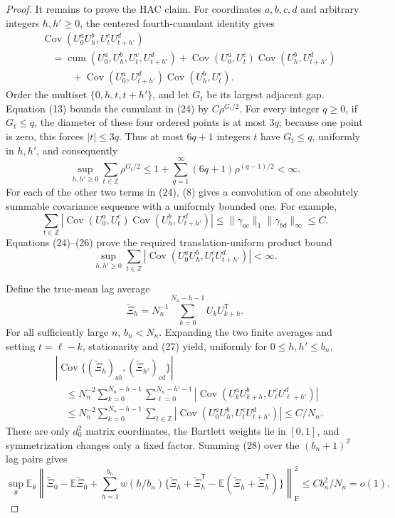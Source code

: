 \documentclass{article}
\begin{document}
\begin{proof}
It remains to prove the HAC claim.  For coordinates \(a,b,c,d\) and arbitrary integers \(h,h'\geq0\), the centered fourth-cumulant identity gives
\[
 \begin{aligned}
 &\operatorname{Cov}(U_0^aU_h^b,U_t^cU_{t+h'}^d)\\
 &\quad=\operatorname{cum}(U_0^a,U_h^b,U_t^c,U_{t+h'}^d)
 +\operatorname{Cov}(U_0^a,U_t^c)\operatorname{Cov}(U_h^b,U_{t+h'}^d)\\
 &\qquad\quad
 +\operatorname{Cov}(U_0^a,U_{t+h'}^d)\operatorname{Cov}(U_h^b,U_t^c).
 \end{aligned}
\tag{24}
\]
Order the multiset \(\{0,h,t,t+h'\}\), and let \(G_t\) be its largest adjacent gap.  Equation (13) bounds the cumulant in (24) by \(C\rho^{G_t/2}\).  For every integer \(q\geq0\), if \(G_t\leq q\), the diameter of these four ordered points is at most \(3q\); because one point is zero, this forces \(|t|\leq3q\).  Thus at most \(6q+1\) integers \(t\) have \(G_t\leq q\), uniformly in \(h,h'\), and consequently
\[
 \sup_{h,h'\geq0}\sum_{t\in\mathbb Z}\rho^{G_t/2}
 \leq 1+\sum_{q=1}^\infty(6q+1)\rho^{(q-1)/2}<\infty.
\tag{25}
\]
For each of the other two terms in (24), (8) gives a convolution of one absolutely summable covariance sequence with a uniformly bounded one.  For example,
\[
 \sum_{t\in\mathbb Z}
 |\operatorname{Cov}(U_0^a,U_t^c)
   \operatorname{Cov}(U_h^b,U_{t+h'}^d)|
 \leq
 \lVert\gamma_{ac}\rVert_1\lVert\gamma_{bd}\rVert_\infty\leq C.
\tag{26}
\]
Equations (24)--(26) prove the required translation-uniform product bound
\[
 \sup_{h,h'\geq0}\sum_{t\in\mathbb Z}
 |\operatorname{Cov}(U_0^aU_h^b,U_t^cU_{t+h'}^d)|<\infty.
\tag{27}
\]

Define the true-mean lag average
\[
 \widetilde\Xi_h=N_n^{-1}\sum_{k=0}^{N_n-h-1}U_kU_{k+h}^{\mathsf T}.
\]
For all sufficiently large \(n\), \(b_n<N_n\).  Expanding the two finite averages and setting \(t=\ell-k\), stationarity and (27) yield, uniformly for \(0\leq h,h'\leq b_n\),
\[
 \begin{aligned}
 &\left|\operatorname{Cov}\{(\widetilde\Xi_h)_{ab},
                         (\widetilde\Xi_{h'})_{cd}\}\right|\\
 &\quad\leq N_n^{-2}\sum_{k=0}^{N_n-h-1}
       \sum_{\ell=0}^{N_n-h'-1}
       |\operatorname{Cov}(U_k^aU_{k+h}^b,U_\ell^cU_{\ell+h'}^d)|\\
 &\quad\leq N_n^{-2}\sum_{k=0}^{N_n-h-1}
       \sum_{t\in\mathbb Z}
       |\operatorname{Cov}(U_0^aU_h^b,U_t^cU_{t+h'}^d)|
 \leq C/N_n.
 \end{aligned}
\tag{28}
\]
There are only \(d_0^2\) matrix coordinates, the Bartlett weights lie in \([0,1]\), and symmetrization changes only a fixed factor.  Summing (28) over the \((b_n+1)^2\) lag pairs gives
\[
 \sup_\theta\mathbb E_\theta\left\lVert
 \widetilde\Xi_0-\mathbb E\widetilde\Xi_0
 +\sum_{h=1}^{b_n}w(h/b_n)
 \{\widetilde\Xi_h+\widetilde\Xi_h^{\mathsf T}
   -\mathbb E(\widetilde\Xi_h+\widetilde\Xi_h^{\mathsf T})\}
 \right\rVert_{\mathrm F}^2
 \leq Cb_n^2/N_n=o(1).
\tag{29}
\]


\end{proof}
\end{document}
